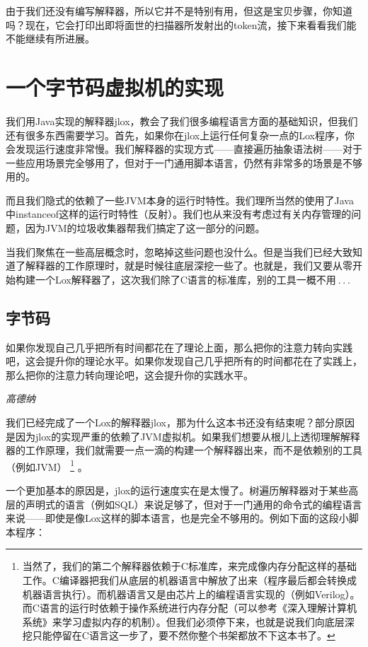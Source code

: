 \documentclass[cn,10pt,math=newtx,citestyle=gb7714-2015,bibstyle=gb7714-2015]{elegantbook}
\begin{document}
由于我们还没有编写解释器，所以它并不是特别有用，但这是宝贝步骤，你知道吗？现在，它会打印出即将面世的扫描器所发射出的token流，接下来看看我们能不能继续有所进展。

\part{一个字节码虚拟机的实现}

我们用Java实现的解释器jlox，教会了我们很多编程语言方面的基础知识，但我们还有很多东西需要学习。首先，如果你在jlox上运行任何复杂一点的Lox程序，你会发现运行速度非常慢。我们解释器的实现方式——直接遍历抽象语法树——对于一些应用场景完全够用了，但对于一门通用脚本语言，仍然有非常多的场景是不够用的。

而且我们隐式的依赖了一些JVM本身的运行时特性。我们理所当然的使用了Java中instanceof这样的运行时特性（反射）。我们也从来没有考虑过有关内存管理的问题，因为JVM的垃圾收集器帮我们搞定了这一部分的问题。

当我们聚焦在一些高层概念时，忽略掉这些问题也没什么。但是当我们已经大致知道了解释器的工作原理时，就是时候往底层深挖一些了。也就是，我们又要从零开始构建一个Lox解释器了，这次我们除了C语言的标准库，别的工具一概不用 . . . 

\chapter{字节码}

\epigraph{如果你发现自己几乎把所有时间都花在了理论上面，那么把你的注意力转向实践吧，这会提升你的理论水平。如果你发现自己几乎把所有的时间都花在了实践上，那么把你的注意力转向理论吧，这会提升你的实践水平。}{\textit{高德纳}}

我们已经完成了一个Lox的解释器jlox，那为什么这本书还没有结束呢？部分原因是因为jlox的实现严重的依赖了JVM虚拟机。如果我们想要从根儿上透彻理解解释器的工作原理，我们就需要一点一滴的构建一个解释器出来，而不是依赖别的工具（例如JVM） \footnote{当然了，我们的第二个解释器依赖于C标准库，来完成像内存分配这样的基础工作。C编译器把我们从底层的机器语言中解放了出来（程序最后都会转换成机器语言执行）。而机器语言又是由芯片上的编程语言实现的（例如Verilog）。而C语言的运行时依赖于操作系统进行内存分配（可以参考《深入理解计算机系统》来学习虚拟内存的机制）。但我们必须停下来，也就是说我们向底层深挖只能停留在C语言这一步了，要不然你整个书架都放不下这本书了。} 。 

一个更加基本的原因是，jlox的运行速度实在是太慢了。树遍历解释器对于某些高层的声明式的语言（例如SQL）来说足够了，但对于一门通用的命令式的编程语言来说——即使是像Lox这样的脚本语言，也是完全不够用的。例如下面的这段小脚本程序：
\end{document}
